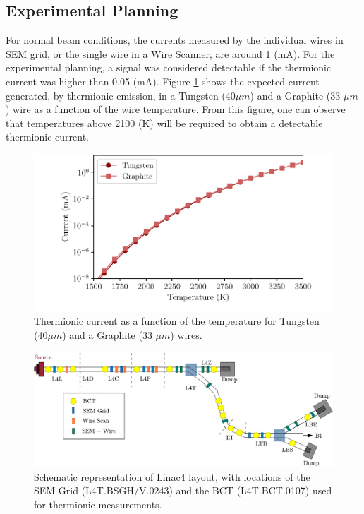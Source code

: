 \subsection{Experimental Planning}

For normal beam conditions, the currents measured by the individual wires in SEM grid, or the single wire in a Wire Scanner, are around 1 (mA). For the experimental planning, a signal was considered detectable if the thermionic current was higher than 0.05 (mA). Figure \ref{fig:ThermCurrent} shows the expected current generated, by thermionic emission, in a Tungsten (40$\mu m$) and a Graphite (33 $\mu m$) wire as a function of the wire temperature. From this figure, one can observe that temperatures above 2100 (K) will be required to obtain a detectable thermionic current.  
\begin{figure}[h]
    \centering
    \includegraphics[width=1.0\columnwidth]{Figure_ThermoionicCurrent/ThermoCurrent.pdf}
    \caption{Thermionic current as a function of the temperature for Tungsten (40$\mu m$) and a Graphite (33 $\mu m$) wires.}
    \label{fig:ThermCurrent}
\end{figure}
\begin{figure}[h!]
    \centering
    \includegraphics[width=1.0\columnwidth]{Linac4Instrumetnation/Linac4Instruments.pdf}
    \caption{Schematic representation of Linac4 layout, with locations of the SEM Grid (L4T.BSGH/V.0243) and the BCT (L4T.BCT.0107) used for thermionic measurements.}
    \label{fig:DetLocation}
\end{figure}

